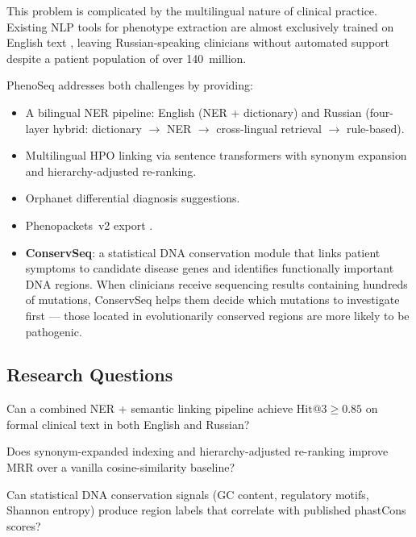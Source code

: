 \documentclass[11pt,a4paper]{article}
\begin{document}
This problem is complicated by the multilingual nature of clinical practice.
Existing NLP tools for phenotype extraction are almost exclusively trained on
English text \cite{nevéol2018}, leaving Russian-speaking clinicians without
automated support despite a patient population of over 140~million.

PhenoSeq addresses both challenges by providing:
\begin{itemize}[nosep]
  \item A bilingual NER pipeline: English (NER + dictionary) and Russian
        (four-layer hybrid: dictionary $\to$ NER $\to$ cross-lingual retrieval
        $\to$ rule-based).
  \item Multilingual HPO linking via sentence transformers with synonym
        expansion and hierarchy-adjusted re-ranking.
  \item Orphanet differential diagnosis suggestions.
  \item Phenopackets~v2 export \cite{jacobsen2022}.
  \item \textbf{ConservSeq}: a statistical DNA conservation module that links
        patient symptoms to candidate disease genes and identifies functionally
        important DNA regions.  When clinicians receive sequencing results
        containing hundreds of mutations, ConservSeq helps them decide which
        mutations to investigate first --- those located in evolutionarily
        conserved regions are more likely to be pathogenic.
\end{itemize}

\subsection{Research Questions}

\begin{description}[nosep]
  \item[RQ1.] Can a combined NER + semantic linking pipeline achieve
        $\text{Hit@3} \geq 0.85$ on formal clinical text in both English and
        Russian?
  \item[RQ2.] Does synonym-expanded indexing and hierarchy-adjusted re-ranking
        improve MRR over a vanilla cosine-similarity baseline?
  \item[RQ3.] Can statistical DNA conservation signals (GC content, regulatory
        motifs, Shannon entropy) produce region labels that correlate with
        published phastCons scores?
\end{description}
\end{document}
